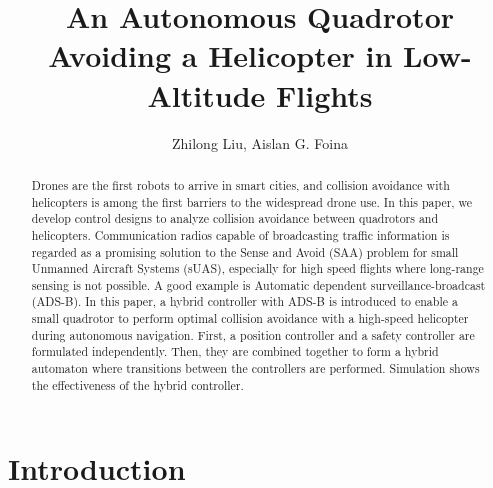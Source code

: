 \documentclass[journal,11pt,onecolumn,draftclsnofoot,]{IEEEtran}
\begin{document}
\title{An Autonomous Quadrotor Avoiding a Helicopter in Low-Altitude Flights}

\author{Zhilong Liu, Aislan G. Foina}


\maketitle
{}

\begin{abstract}
Drones are the first robots to arrive in smart cities, and collision avoidance with helicopters is among the first barriers to the widespread drone use. In this paper, we develop control designs to analyze collision avoidance between quadrotors and helicopters. Communication radios capable of broadcasting traffic information is regarded as a promising solution to the Sense and Avoid (SAA) problem for small Unmanned Aircraft Systems (sUAS), especially for high speed flights where long-range sensing is not possible. A good example is Automatic dependent surveillance-broadcast (ADS-B). In this paper, a hybrid controller with ADS-B is introduced to enable a small quadrotor to perform optimal collision avoidance with a high-speed helicopter during autonomous navigation. First, a position controller and a safety controller are formulated independently. Then, they are combined together to form a hybrid automaton where transitions between the controllers are performed. Simulation shows the effectiveness of the hybrid controller.

\end{abstract}



\section{\textbf{Introduction}}
\end{document}
